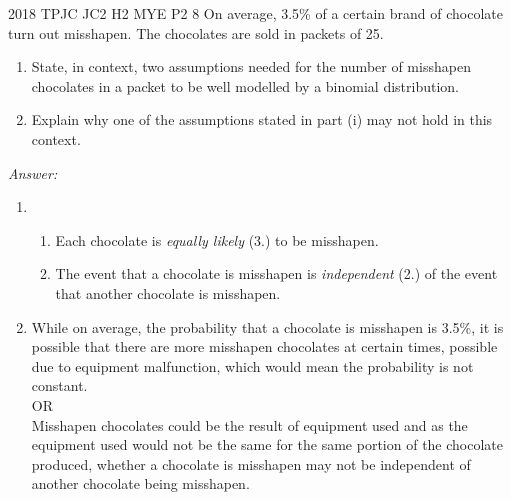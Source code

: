\documentclass[oneside]{book}
\begin{document}
\begin{example}{2018 TPJC JC2 H2 MYE P2 8}{}
  On average, 3.5\% of a certain brand of chocolate turn out misshapen. The chocolates are sold in packets of 25.
  \begin{enumerate}[label=(\roman*)]
    \item State, in context, two assumptions needed for the number of misshapen chocolates in a packet to be well modelled by a binomial distribution.
    \item Explain why one of the assumptions stated in part (i) may not hold in this context.
  \end{enumerate}
  \textit{Answer:}
  \begin{enumerate}[label=(\roman*)]
    \item 
    \begin{enumerate}[label=\arabic*.]
      \item Each chocolate is \emph{equally likely} (3.) to be misshapen.
      \item The event that a chocolate is misshapen is \emph{independent} (2.) of the event that another chocolate is misshapen.
    \end{enumerate}
    \item While on average, the probability that a chocolate is misshapen is 3.5\%, it is possible that there are more misshapen chocolates at certain times, possible due to equipment malfunction, which would mean the probability is not constant.\\[3mm]
    OR\\[3mm]
    Misshapen chocolates could be the result of equipment used and as the equipment used would not be the same for the same portion of the chocolate produced, whether a chocolate is misshapen may not be independent of another chocolate being misshapen.
  \end{enumerate}
\end{example}





\end{document}
